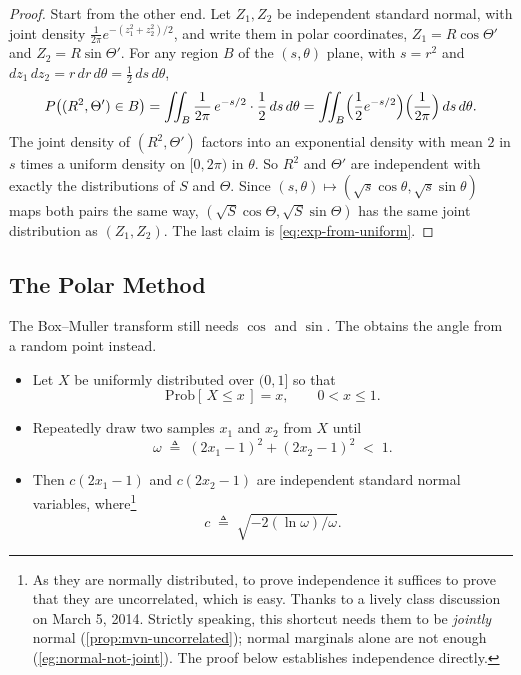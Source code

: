 \begin{proof}
	Start from the other end.
	Let $Z_{1},Z_{2}$ be independent standard normal, with joint density $\frac{1}{2\pi}e^{-(z_{1}^{2}+z_{2}^{2})/2}$, and write them in polar coordinates, $Z_{1}=R\cos\Theta'$ and $Z_{2}=R\sin\Theta'$.
	For any region $B$ of the $(s,\theta)$ plane, with $s=r^{2}$ and $dz_{1}\,dz_{2}=r\,dr\,d\theta=\tfrac12\,ds\,d\theta$,
	\[
		P\bigl((R^{2},\Theta')\in B\bigr)
		= \iint_{B}\frac{1}{2\pi}\,e^{-s/2}\cdot\frac12\,ds\,d\theta
		= \iint_{B}\Bigl(\frac12e^{-s/2}\Bigr)\Bigl(\frac{1}{2\pi}\Bigr)\,ds\,d\theta .
	\]
	The joint density of $(R^{2},\Theta')$ factors into an exponential density with mean $2$ in $s$ times a uniform density on $[0,2\pi)$ in $\theta$.
	So $R^{2}$ and $\Theta'$ are independent with exactly the distributions of $S$ and $\Theta$.
	Since $(s,\theta)\mapsto(\sqrt{s}\cos\theta,\sqrt{s}\sin\theta)$ maps both pairs the same way, $(\sqrt{S}\cos\Theta,\sqrt{S}\sin\Theta)$ has the same joint distribution as $(Z_{1},Z_{2})$.
	The last claim is \eqref{eq:exp-from-uniform}.
\end{proof}
\suppend

\subsection{The Polar Method}

\suppstart
The Box--Muller transform still needs $\cos$ and $\sin$.
The  obtains the angle from a random point instead.
\suppend

\begin{itemize}[itemsep=0.35em]
	\item Let $X$ be uniformly distributed over $(0,1]$ so that
	      \[
		      \mathrm{Prob}[\,X\le x\,]=x, \qquad 0<x\le 1 .
	      \]
	\item Repeatedly draw two samples $x_{1}$ and $x_{2}$ from $X$ until
	      \[
		      \omega \;\triangleq\; (2x_{1}-1)^{2}+(2x_{2}-1)^{2} \;<\; 1 .
	      \]
	\item Then $c(2x_{1}-1)$ and $c(2x_{2}-1)$ are independent standard normal variables, where\footnote{As they are normally distributed, to prove independence it suffices to prove that they are uncorrelated, which is easy. Thanks to a lively class discussion on March 5, 2014. Strictly speaking, this shortcut needs them to be \emph{jointly} normal (\autoref{prop:mvn-uncorrelated}); normal marginals alone are not enough (\autoref{eg:normal-not-joint}). The proof below establishes independence directly.}
	      \[
		      c \;\triangleq\; \sqrt{-2(\ln\omega)/\omega} .
	      \]
\end{itemize}

